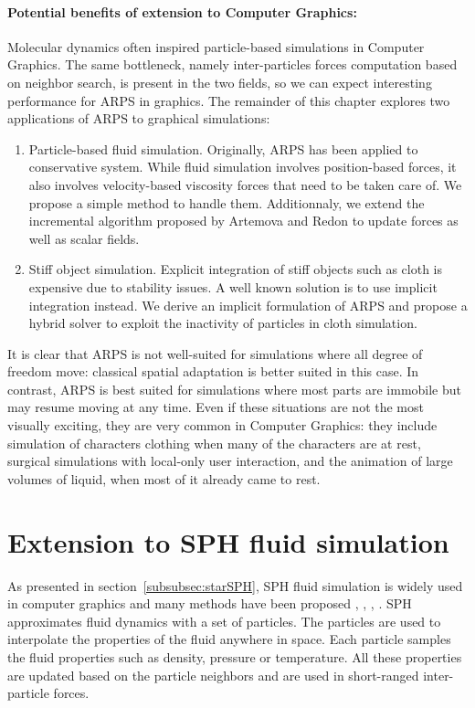 \paragraph*{Potential benefits of extension to Computer Graphics:}
Molecular dynamics often inspired particle-based simulations in Computer Graphics. The same bottleneck, namely inter-particles forces computation based on neighbor search, is present in the two fields, so we can expect interesting performance for ARPS in graphics. The remainder of this chapter explores two applications of ARPS to graphical simulations:
\begin{enumerate}
\item Particle-based fluid simulation. Originally, ARPS has been applied to conservative system. While fluid simulation involves position-based forces, it also involves velocity-based viscosity forces that need to be taken care of. We propose a simple method to handle them. Additionnaly, we extend the incremental algorithm proposed by Artemova and Redon to update forces as well as scalar fields.
\item Stiff object simulation. Explicit integration of stiff objects such as cloth is expensive due to stability issues. A well known solution is to use implicit integration instead. We derive an implicit formulation of ARPS and propose a hybrid solver to exploit the inactivity of particles in cloth simulation.
\end{enumerate}
It is clear that ARPS is not well-suited for simulations where all degree of freedom move: classical spatial adaptation is better suited in this case. In contrast, ARPS is best suited for simulations where most parts are immobile but may resume moving at any time. Even if these situations are not the most visually exciting, they are very common in Computer Graphics: they include simulation of characters clothing when many of the characters are at rest, surgical simulations with local-only user interaction, and the animation of large volumes of liquid, when most of it already came to rest.

\section{ Extension to SPH fluid simulation } 
\label{sec:arps_sph}
As presented in section~\ref{subsubsec:starSPH}, SPH fluid simulation is widely used in computer graphics and many methods have been proposed \cite{Desbrun1996}, \cite{Muller2003}, \cite{Solenthaler2009}, \cite{Ihmsen2014:IISPH}.
SPH approximates fluid dynamics with a set of particles.
The particles are used to interpolate the properties of the fluid anywhere in space.
Each particle samples the fluid properties such as density, pressure or temperature. All these properties are updated based on the particle neighbors and are
used in short-ranged inter-particle forces.
